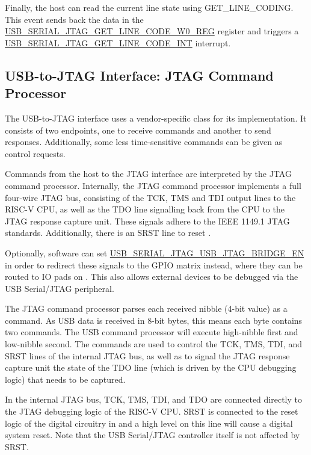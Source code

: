 \documentclass[main\_\_EN.tex]{subfiles}
\begin{document}
Finally, the host can read the current line state using GET\_LINE\_CODING. This event sends back the data in the \hyperref[regdesc:USBSERIALJTAGGETLINECODEW0REG]{USB\_SERIAL\_JTAG\_GET\_LINE\_CODE\_W0\_REG} register and triggers a \hyperref[int:USBSERIALJTAGGETLINECODEINT]{USB\_SERIAL\_JTAG\_GET\_LINE\_CODE\_INT} interrupt.

\subsection{USB-to-JTAG Interface: JTAG Command Processor}

The USB-to-JTAG interface uses a vendor-specific class for its implementation. It consists of two endpoints, one to receive commands and another to send responses. Additionally, some less time-sensitive commands can be given as control requests.

Commands from the host to the JTAG interface are interpreted by the JTAG command processor. Internally, the JTAG command processor implements a full four-wire JTAG bus, consisting of the TCK, TMS and TDI output lines to the RISC-V CPU, as well as the TDO line signalling back from the CPU to the JTAG response capture unit. These signals adhere to the IEEE 1149.1 JTAG standards. Additionally, there is an SRST line to reset \chipname{}.

Optionally, software can set \hyperref[fielddesc:USBSERIALJTAGUSBJTAGBRIDGEEN]{USB\_SERIAL\_JTAG\_USB\_JTAG\_BRIDGE\_EN} in order to redirect these signals to the GPIO matrix instead, where they can be routed to IO pads on \chipname{}. This also allows external devices to be debugged via the USB Serial/JTAG peripheral.

The JTAG command processor parses each received nibble (4-bit value) as a command. As USB data is received in 8-bit bytes, this means each byte contains two commands. The USB command processor will execute high-nibble first and low-nibble second. The commands are used to control the TCK, TMS, TDI, and SRST lines of the internal JTAG bus, as well as to signal the JTAG response capture unit the state of the TDO line (which is driven by the CPU debugging logic) that needs to be captured.

In the internal JTAG bus, TCK, TMS, TDI, and TDO are connected directly to the JTAG debugging logic of the RISC-V CPU. SRST is connected to the reset logic of the digital circuitry in \chipname{} and a high level on this line will cause a digital system reset. Note that the USB Serial/JTAG controller itself is not affected by SRST.
\end{document}
